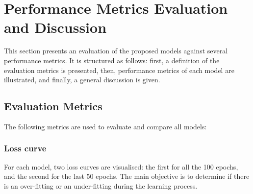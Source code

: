 \section{Performance Metrics Evaluation and Discussion} 
This section presents an evaluation of the proposed models against several performance metrics. It is structured as follows: first, a definition of the evaluation metrics is presented, then, performance metrics of each model are illustrated, and finally, a general discussion is given. 

\subsection{Evaluation Metrics}
The following metrics are used to evaluate and compare all models:
 \subsubsection{Loss curve}
 For each model, two loss curves are visualised: the first for all the 100 epochs, and the second for the last 50 epochs. The main objective is to determine if there is an over-fitting or an under-fitting during the learning process.

